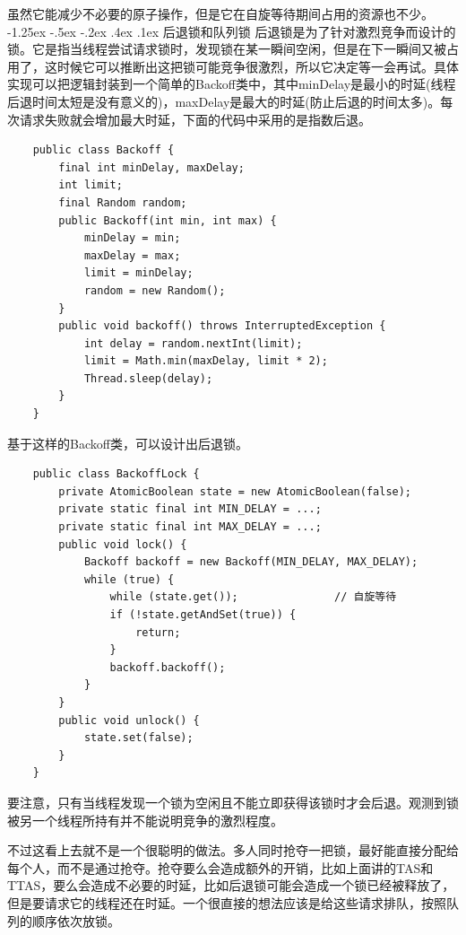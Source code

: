 \documentclass[a4paper, 11pt]{ctexart}
\makeatletter
\newcommand{\xiaosihao}{\fontsize{12pt}{\baselineskip}\selectfont}
\renewcommand\subsection{\@startsection{subsection}{1}{\z@}%
{-1.25ex \@plus -.5ex \@minus -.2ex}%
{.4ex \@plus .1ex}%
{\normalfont\xiaosihao\CJKfamily{hei}}}
\makeatother
\begin{document}
虽然它能减少不必要的原子操作，但是它在自旋等待期间占用的资源也不少。
\subsection{后退锁和队列锁}
后退锁是为了针对激烈竞争而设计的锁。它是指当线程尝试请求锁时，发现锁在某一瞬间空闲，但是在下一瞬间又被占用了，这时候它可以推断出这把锁可能竞争很激烈，所以它决定等一会再试。具体实现可以把逻辑封装到一个简单的Backoff类中，其中minDelay是最小的时延(线程后退时间太短是没有意义的)，maxDelay是最大的时延(防止后退的时间太多)。每次请求失败就会增加最大时延，下面的代码中采用的是指数后退。
\begin{lstlisting}
    public class Backoff {
        final int minDelay, maxDelay;
        int limit;
        final Random random;
        public Backoff(int min, int max) {
            minDelay = min;
            maxDelay = max;
            limit = minDelay;
            random = new Random();
        }
        public void backoff() throws InterruptedException {
            int delay = random.nextInt(limit);
            limit = Math.min(maxDelay, limit * 2);
            Thread.sleep(delay);
        }
    }
\end{lstlisting} 

基于这样的Backoff类，可以设计出后退锁。
\begin{lstlisting}
    public class BackoffLock {
        private AtomicBoolean state = new AtomicBoolean(false);
        private static final int MIN_DELAY = ...;
        private static final int MAX_DELAY = ...;
        public void lock() {
            Backoff backoff = new Backoff(MIN_DELAY, MAX_DELAY);
            while (true) {
                while (state.get());               // 自旋等待
                if (!state.getAndSet(true)) {
                    return;
                }
                backoff.backoff();
            }
        }
        public void unlock() {
            state.set(false);
        }
    }
\end{lstlisting}

要注意，只有当线程发现一个锁为空闲且不能立即获得该锁时才会后退。观测到锁被另一个线程所持有并不能说明竞争的激烈程度。

不过这看上去就不是一个很聪明的做法。多人同时抢夺一把锁，最好能直接分配给每个人，而不是通过抢夺。抢夺要么会造成额外的开销，比如上面讲的TAS和TTAS，要么会造成不必要的时延，比如后退锁可能会造成一个锁已经被释放了，但是要请求它的线程还在时延。一个很直接的想法应该是给这些请求排队，按照队列的顺序依次放锁。
\end{document}
